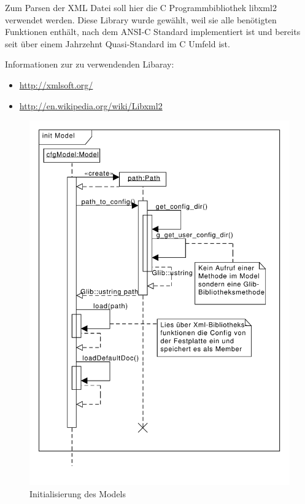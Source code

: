 Zum Parsen der XML Datei soll hier die C Programmbibliothek libxml2 verwendet werden. Diese Library wurde gewählt, weil sie alle benötigten Funktionen enthält, nach dem ANSI-C Standard implementiert ist
und bereits seit über einem Jahrzehnt Quasi-Standard im C Umfeld ist.

Informationen zur zu verwendenden Libaray:

    \begin{itemize}
        \item \url{http://xmlsoft.org/}
        \item \url{http://en.wikipedia.org/wiki/Libxml2}
    \end{itemize}

\begin{figure}[htb!]
    \centering
    \includegraphics[scale=0.6]{./gfx/seq/init_model}
    \caption{Initialisierung des Models}
    \label{c_modelinit}
\end{figure}


